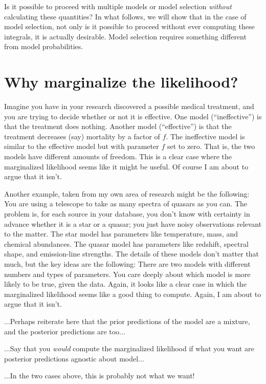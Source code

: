 \documentclass[12pt,twoside]{article}
\begin{document}
Is it possible to proceed with multiple models or model selection
  \emph{without} calculating these quantities?
In what follows, we will show that in the case of model selection,
  not only is it possible to proceed without ever computing these integrals,
  it is actually desirable.
Model selection requires something different from model probabilities.

\section{Why marginalize the likelihood?}

Imagine you have in your research discovered a possible medical treatment,
  and you are trying to decide whether or not it is effective.
One model (``ineffective'') is that the treatment does nothing.
Another model (``effective'') is that the treatment decreases (say) mortality by a factor of $f$.
The ineffective model is similar to the effective model but with parameter $f$ set to zero.
That is, the two models have different amounts of freedom.
This is a clear case where the marginalized likelihood seems like it might be useful.
Of course I am about to argue that it isn't.

Another example, taken from my own area of research might be the following:
You are using a telescope to take as many spectra of quasars as you can.
The problem is, for each source in your database,
  you don't know with certainty in advance whether it is a star or a quasar;
  you just have noisy observations relevant to the matter.
The star model has parameters like temperature, mass, and chemical abundances.
The quasar model has parameters like redshift, spectral shape, and emission-line strengths.
The details of these models don't matter that much, but the key ideas are the following:
There are two models with different numbers and types of parameters.
You care deeply about which model is more likely to be true, given the data.
Again, it looks like a clear case in which the marginalized likelihood seems like a good thing to compute.
Again, I am about to argue that it isn't.

...Perhaps reiterate here that the prior predictions of the model are a mixture,
  and the posterior predictions are too...

...Say that you \emph{would} compute the marginalized likelihood if what you want
  are posterior predictions agnostic about model...

...In the two cases above, this is probably not what we want!
\end{document}
